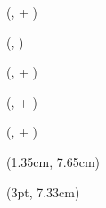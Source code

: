 \ResolveCalc
\begin{textblock*}{2.1cm}(\AttributeX, \AttributeY + )
    \ifexpectedvalue
        \AttributeFormat{\ExpectedValue{\ResolveVal}}
    \else
        \AttributeFormat{\SuccessProbability{\ResolveVal}}
    \fi
\end{textblock*}

\begin{textblock*}{2.1cm}(\ActionX, \ResolveY)
    \ActionFormat{\SuccessProbability{\Attune}}
\end{textblock*}
\begin{textblock*}{2.1cm}(\ActionX, \ResolveY + \ActionYOffset)
    \ActionFormat{\SuccessProbability{\Command}}
\end{textblock*}
\begin{textblock*}{2.1cm}(\ActionX, \ResolveY + )
    \ActionFormat{\SuccessProbability{\Consort}}
\end{textblock*}
\begin{textblock*}{2.1cm}(\ActionX, \ResolveY + )
    \ActionFormat{\SuccessProbability{\Sway}}
\end{textblock*}


\ViceAttributeCalc
\begin{textblock*}{5cm}(1.35cm, 7.65cm)
\end{textblock*}

\setlength{\tabcolsep}{1pt}
\begin{textblock*}{5cm}(3pt, 7.33cm)
\end{textblock*}
\setlength{\tabcolsep}{6pt}


